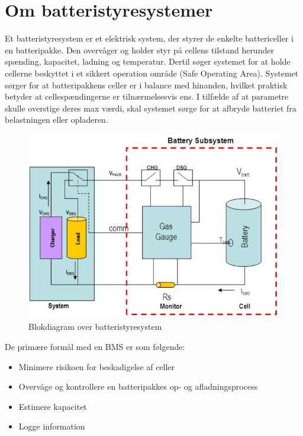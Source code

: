 \section{Om batteristyresystemer}
Et batteristyresystem er et elektrisk system, der styrer de enkelte battericeller i en batteripakke. Den overvåger og holder styr på cellens tilstand herunder spænding, kapacitet, ladning og temperatur. Dertil søger systemet for at holde cellerne beskyttet i et sikkert operation område (Safe Operating Area). Systemet sørger for at batteripakkens celler er i balance med hinanden, hvilket praktisk betyder at cellespændingerne er tilnærmelsesvis ens. I tilfælde af at parametre skulle overstige deres max værdi, skal systemet sørge for at afbryde batteriet fra belastningen eller opladeren.
\\

\begin{figure}[h]
	\centering
	\includegraphics[width=12cm]{billeder/battery_management_block.png}
	\caption{Blokdiagram over batteristyresystem}
	\label{fig:battery_management_block}
\end{figure}

De primære formål med en BMS er som følgende:
\begin{itemize}[noitemsep]
	\item Minimere risikoen for beskadigelse af celler
	\item Overvåge og kontrollere en batteripakkes op- og afladningsprocess
	\item Estimere kapacitet
	\item Logge information
\end{itemize}




